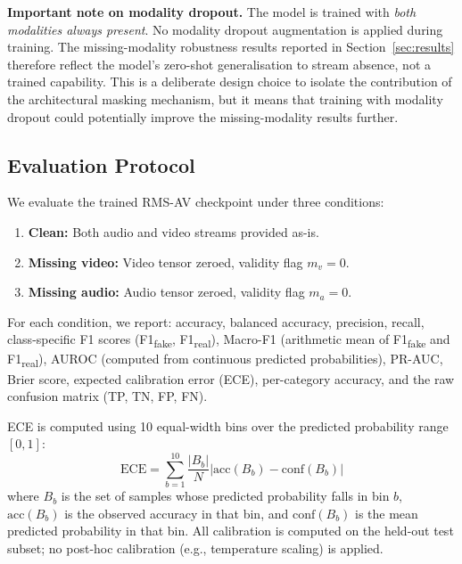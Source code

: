\documentclass[conference]{IEEEtran}
\begin{document}
\textbf{Important note on modality dropout.} The model is trained with \emph{both modalities always present}. No modality dropout augmentation is applied during training. The missing-modality robustness results reported in Section~\ref{sec:results} therefore reflect the model's zero-shot generalisation to stream absence, not a trained capability. This is a deliberate design choice to isolate the contribution of the architectural masking mechanism, but it means that training with modality dropout could potentially improve the missing-modality results further.

\subsection{Evaluation Protocol}

We evaluate the trained RMS-AV checkpoint under three conditions:
\begin{enumerate}
    \item \textbf{Clean:} Both audio and video streams provided as-is.
    \item \textbf{Missing video:} Video tensor zeroed, validity flag $m_v = 0$.
    \item \textbf{Missing audio:} Audio tensor zeroed, validity flag $m_a = 0$.
\end{enumerate}

For each condition, we report: accuracy, balanced accuracy, precision, recall, class-specific F1 scores (F1\textsubscript{fake}, F1\textsubscript{real}), Macro-F1 (arithmetic mean of F1\textsubscript{fake} and F1\textsubscript{real}), AUROC (computed from continuous predicted probabilities), PR-AUC, Brier score, expected calibration error (ECE), per-category accuracy, and the raw confusion matrix (TP, TN, FP, FN).

ECE is computed using 10 equal-width bins over the predicted probability range $[0, 1]$:
\begin{equation}
\mathrm{ECE} = \sum_{b=1}^{10} \frac{|B_b|}{N} \left| \mathrm{acc}(B_b) - \mathrm{conf}(B_b) \right|
\end{equation}
where $B_b$ is the set of samples whose predicted probability falls in bin $b$, $\mathrm{acc}(B_b)$ is the observed accuracy in that bin, and $\mathrm{conf}(B_b)$ is the mean predicted probability in that bin. All calibration is computed on the held-out test subset; no post-hoc calibration (e.g., temperature scaling) is applied.

\end{document}

